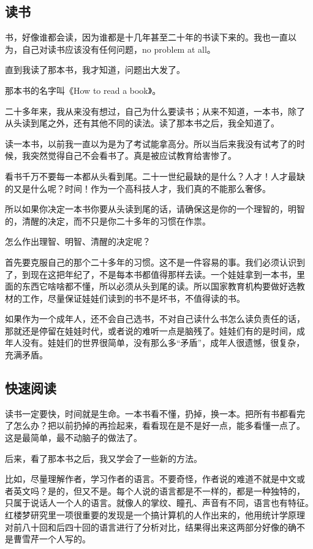 \documentclass[10pt]{article}
\begin{document}
\begin{CJK*}{UTF8}{simsun}
\subsection{读书}

书，好像谁都会读，因为谁都是十几年甚至二十年的书读下来的。我也一直以
为，自己对读书应该没有任何问题，no problem at all。

直到我读了那本书，我才知道，问题出大发了。

那本书的名字叫《How to read a book》。

二十多年来，我从来没有想过，自己为什么要读书；从来不知道，一本书，除了
从头读到尾之外，还有其他不同的读法。读了那本书之后，我全知道了。

读一本书，以前我一直以为是为了考试能拿高分。所以当后来我没有试考了的时
候，我突然觉得自己不会看书了。真是被应试教育给害惨了。

看书千万不要每一本都从头看到尾。二十一世纪最缺的是什么？人才！人才最缺
的又是什么呢？时间！作为一个高科技人才，我们真的不能那么奢侈。

所以如果你决定一本书你要从头读到尾的话，请确保这是你的一个理智的，明智
的，清醒的决定，而不只是你二十多年的习惯在作祟。

怎么作出理智、明智、清醒的决定呢？

首先要克服自己的那个二十多年的习惯。这不是一件容易的事。我们必须认识到
了，到现在这把年纪了，不是每本书都值得那样去读。一个娃娃拿到一本书，里
面的东西它啥啥都不懂，所以必须从头到尾的读。所以国家教育机构要做好选教
材的工作，尽量保证娃娃们读到的书不是坏书，不值得读的书。

如果作为一个成年人，还不会自己选书，不对自己读什么书怎么读负责任的话，
那就还是停留在娃娃时代，或者说的难听一点是脑残了。娃娃们有的是时间，成
年人没有。娃娃们的世界很简单，没有那么多“矛盾”，成年人很遗憾，很复杂，
充满矛盾。

\subsection{快速阅读}

读书一定要快，时间就是生命。一本书看不懂，扔掉，换一本。把所有书都看完
了怎么办？把以前扔掉的再捡起来，看看现在是不是好一点，能多看懂一点了。
这是最简单，最不动脑子的做法了。

后来，看了那本书之后，我又学会了一些新的方法。

比如，尽量理解作者，学习作者的语言。不要奇怪，作者说的难道不就是中文或
者英文吗？是的，但又不是。每个人说的语言都是不一样的，都是一种独特的，
只属于说话人一个人的语言。就像人的掌纹、瞳孔、声音有不同，语言也有特征。
红楼梦研究里一项很重要的发现是一个搞计算机的人作出来的，他用统计学原理
对前八十回和后四十回的语言进行了分析对比，结果得出来这两部分好像的确不
是曹雪芹一个人写的。


\end{CJK*}
\end{document}
